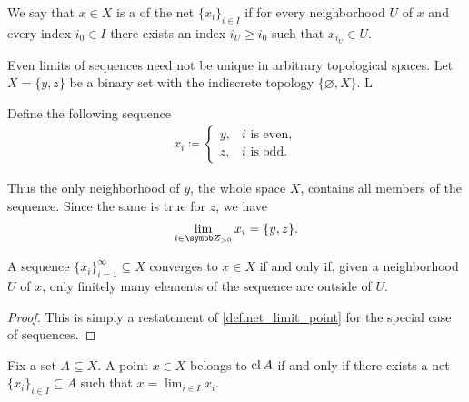 \begin{definition}\label{def:net_cluster_point}\cite[50]{Engelking1989}
  We say that \( x \in X \) is a  of the net \( \{ x_i \}_{i \in I} \) if for every neighborhood \( U \) of \( x \) and every index \( i_0 \in I \) there exists an index \( i_U \geq i_0 \) such that \( x_{i_U} \in U \).
\end{definition}

\begin{example}\label{ex:multiple_limit_points_of_net}
  Even limits of sequences need not be unique in arbitrary topological spaces. Let \( X = \{ y, z \} \) be a binary set with the indiscrete topology \( \{ \varnothing, X \} \). L

  Define the following sequence
  \begin{align*}
    x_i \coloneqq \begin{cases}
      y, &i \text{ is even}, \\
      z, &i \text{ is odd}.
    \end{cases}
  \end{align*}

  Thus the only neighborhood of \( y \), the whole space \( X \), contains all members of the sequence. Since the same is true for \( z \), we have
  \begin{equation*}
    \lim_{i \in \BZ_{>0}} x_i = \{ y, z \}.
  \end{equation*}
\end{example}

\begin{proposition}\label{thm:sequence_converges_iff_almost_entirely_in_neighborhood}
  A sequence \( \{ x_i \}_{i=1}^\infty \subseteq X \) converges to \( x \in X \) if and only if, given a neighborhood \( U \) of \( x \), only finitely many elements of the sequence are outside of \( U \).
\end{proposition}
\begin{proof}
  This is simply a restatement of \cref{def:net_limit_point} for the special case of sequences.
\end{proof}

\begin{proposition}\label{thm:limit_point_iff_in_closure}\cite[proposition 1.6.3]{Engelking1989}
  Fix a set \( A \subseteq X \). A point \( x \in X \) belongs to \( \operatorname{cl}{A} \) if and only if there exists a net \( \{ x_i \}_{i \in I} \subseteq A \) such that \( x = \lim_{i \in I} x_i \).
\end{proposition}

